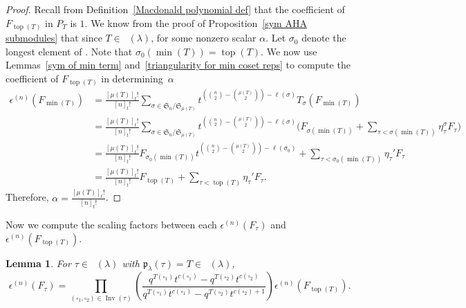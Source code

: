 \documentclass[10pt,a4paper]{amsart}
\numberwithin{equation}{section}
\newtheorem{Lemma}[Theorem]{Lemma}
\theoremstyle{definition}
\DeclareMathOperator{\PSYT}{\mathrm{PSYT}_{\geq 0}}
\DeclareMathOperator{\RSSYT}{\mathrm{RSSYT}_{\geq 0}}
\DeclareMathOperator{\Inv}{\mathrm{Inv}}
\DeclareMathOperator{\Top}{\mathrm{top}}
\DeclareMathOperator{\Min}{\mathrm{min}}
\begin{document}
\begin{proof}
 Recall from Definition~\ref{Macdonald polynomial def} that the coefficient of $F_{\Top(T)}$ in $P_T$ is $1$. We know from the proof of Proposition~\ref{sym AHA submodules} that since $T \in \RSSYT(\lambda)$,
 for some nonzero scalar $\alpha$. Let $\sigma_0$ denote the longest element of . Note that $\sigma_0(\Min(T)) = \Top(T)$. We now use Lemmas~\ref{sym of min term} and~\ref{triangularity for min coset reps} to compute the coefficient of $F_{\Top(T)}$ in  determining~$\alpha$
 \begin{align*}
 \epsilon^{(n)}(F_{\Min(T)}) &
 = \frac{[\mu(T)]_{t}!}{[n]_{t}!} \sum_{\sigma \in \mathfrak{S}_n/\mathfrak{S}_{\mu(T)}} t^{ ({n \choose 2} - {\mu(T) \choose 2}) - \ell(\sigma)}T_{\sigma}(F_{\Min(T)}) \\
 & = \frac{[\mu(T)]_{t}!}{[n]_{t}!} \sum_{\sigma \in \mathfrak{S}_n/\mathfrak{S}_{\mu(T)}} t^{ ({n \choose 2} - {\mu(T) \choose 2}) - \ell(\sigma)} \biggl( F_{\sigma(\Min(T))} + \sum_{\tau < \sigma(\Min(T))} \eta_{\tau}^{\sigma} F_{\tau} \biggr) \\
 & = \frac{[\mu(T)]_{t}!}{[n]_{t}!} F_{\sigma_0(\Min(T))}t^{ ({n \choose 2} - {\mu(T) \choose 2}) - \ell(\sigma_0)} + \sum_{\tau < \sigma_0(\Min(T))} \eta_{\tau}' F_{\tau} \\
 & = \frac{[\mu(T)]_{t}!}{[n]_{t}!}F_{\Top(T)} + \sum_{\tau < \Top(T)} \eta_{\tau}' F_{\tau}.
 \end{align*}
 Therefore, $\alpha = \frac{[\mu(T)]_{t}!}{[n]_{t}!}$.
\end{proof}

Now we compute the scaling factors between each $\epsilon^{(n)}(F_{\tau})$ and $\epsilon^{(n)}(F_{\Top(T)})$.

\begin{Lemma}\label{symmetrization coefficients from top element}
 For $\tau \in \PSYT(\lambda)$ with $\mathfrak{p}_{\lambda}(\tau) = T \in \RSSYT(\lambda)$,
 \[
 \epsilon^{(n)}(F_{\tau}) = \prod_{(\square_1,\square_2) \in \Inv(\tau)} \left( \frac{q^{T(\square_1)}t^{c(\square_1)} - q^{T(\square_2)}t^{c(\square_2) }}{q^{T(\square_1)}t^{c(\square_1)} - q^{T(\square_2)}t^{c(\square_2) +1}} \right) \epsilon^{(n)}(F_{\Top(T)}).
 \]

\end{Lemma}
\end{document}
